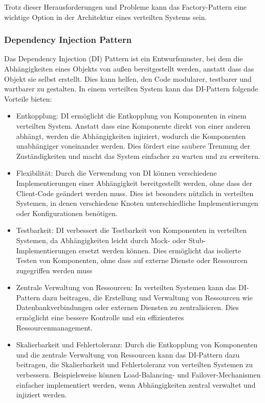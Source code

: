 Trotz dieser Herausforderungen und Probleme kann das Factory-Pattern eine wichtige Option in der Architektur eines verteilten Systems sein. 

\subsubsection{Dependency Injection Pattern}

Das Dependency Injection (DI) Pattern ist ein Entwurfsmuster, bei dem die Abhängigkeiten eines Objekts von außen bereitgestellt werden, anstatt dass das Objekt sie selbst erstellt. Dies kann helfen, den Code modularer, testbarer und wartbarer zu gestalten. In einem verteilten System kann das DI-Pattern folgende Vorteile bieten:
\begin{itemize}
\item Entkopplung: DI ermöglicht die Entkopplung von Komponenten in einem verteilten System. Anstatt dass eine Komponente direkt von einer anderen abhängt, werden die Abhängigkeiten injiziert, wodurch die Komponenten unabhängiger voneinander werden. Dies fördert eine saubere Trennung der Zuständigkeiten und macht das System einfacher zu warten und zu erweitern.
\item Flexibilität: Durch die Verwendung von DI können verschiedene Implementierungen einer Abhängigkeit bereitgestellt werden, ohne dass der Client-Code geändert werden muss. Dies ist besonders nützlich in verteilten Systemen, in denen verschiedene Knoten unterschiedliche Implementierungen oder Konfigurationen benötigen.
\item Testbarkeit: DI verbessert die Testbarkeit von Komponenten in verteilten Systemen, da Abhängigkeiten leicht durch Mock- oder Stub-Implementierungen ersetzt werden können. Dies ermöglicht das isolierte Testen von Komponenten, ohne dass auf externe Dienste oder Ressourcen zugegriffen werden muss
\item Zentrale Verwaltung von Ressourcen: In verteilten Systemen kann das DI-Pattern dazu beitragen, die Erstellung und Verwaltung von Ressourcen wie Datenbankverbindungen oder externen Diensten zu zentralisieren. Dies ermöglicht eine bessere Kontrolle und ein effizienteres Ressourcenmanagement.
\item Skalierbarkeit und Fehlertoleranz: Durch die Entkopplung von Komponenten und die zentrale Verwaltung von Ressourcen kann das DI-Pattern dazu beitragen, die Skalierbarkeit und Fehlertoleranz von verteilten Systemen zu verbessern. Beispielsweise können Load-Balancing- und Failover-Mechanismen einfacher implementiert werden, wenn Abhängigkeiten zentral verwaltet und injiziert werden.
\end{itemize}

